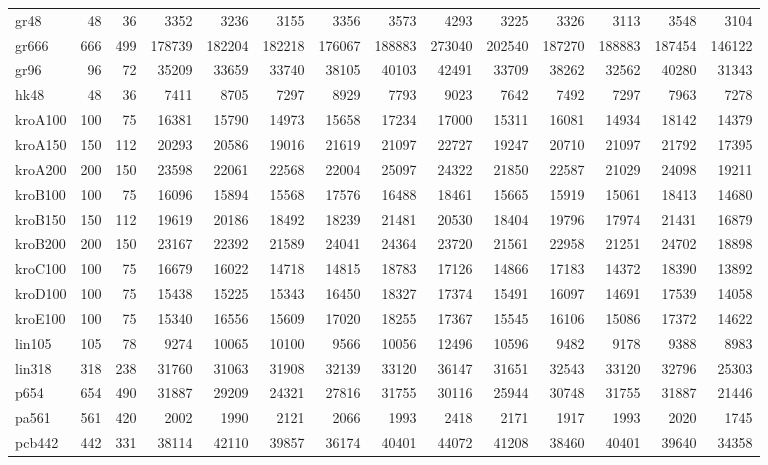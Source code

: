 {\begin{longtable}{l r r r r r r r r r r r r r}
gr48 & 48 & 36 & 3352 & 3236 & 3155 & 3356 & 3573 & 4293 & 3225 & 3326 & 3113 & 3548 & 3104 \\
gr666 & 666 & 499 & 178739 & 182204 & 182218 & 176067 & 188883 & 273040 & 202540 & 187270 & 188883 & 187454 & 146122 \\
gr96 & 96 & 72 & 35209 & 33659 & 33740 & 38105 & 40103 & 42491 & 33709 & 38262 & 32562 & 40280 & 31343 \\
hk48 & 48 & 36 & 7411 & 8705 & 7297 & 8929 & 7793 & 9023 & 7642 & 7492 & 7297 & 7963 & 7278 \\
kroA100 & 100 & 75 & 16381 & 15790 & 14973 & 15658 & 17234 & 17000 & 15311 & 16081 & 14934 & 18142 & 14379 \\
kroA150 & 150 & 112 & 20293 & 20586 & 19016 & 21619 & 21097 & 22727 & 19247 & 20710 & 21097 & 21792 & 17395 \\
kroA200 & 200 & 150 & 23598 & 22061 & 22568 & 22004 & 25097 & 24322 & 21850 & 22587 & 21029 & 24098 & 19211 \\
kroB100 & 100 & 75 & 16096 & 15894 & 15568 & 17576 & 16488 & 18461 & 15665 & 15919 & 15061 & 18413 & 14680 \\
kroB150 & 150 & 112 & 19619 & 20186 & 18492 & 18239 & 21481 & 20530 & 18404 & 19796 & 17974 & 21431 & 16879 \\
kroB200 & 200 & 150 & 23167 & 22392 & 21589 & 24041 & 24364 & 23720 & 21561 & 22958 & 21251 & 24702 & 18898 \\
kroC100 & 100 & 75 & 16679 & 16022 & 14718 & 14815 & 18783 & 17126 & 14866 & 17183 & 14372 & 18390 & 13892 \\
kroD100 & 100 & 75 & 15438 & 15225 & 15343 & 16450 & 18327 & 17374 & 15491 & 16097 & 14691 & 17539 & 14058 \\
kroE100 & 100 & 75 & 15340 & 16556 & 15609 & 17020 & 18255 & 17367 & 15545 & 16106 & 15086 & 17372 & 14622 \\
lin105 & 105 & 78 & 9274 & 10065 & 10100 & 9566 & 10056 & 12496 & 10596 & 9482 & 9178 & 9388 & 8983 \\
lin318 & 318 & 238 & 31760 & 31063 & 31908 & 32139 & 33120 & 36147 & 31651 & 32543 & 33120 & 32796 & 25303 \\
p654 & 654 & 490 & 31887 & 29209 & 24321 & 27816 & 31755 & 30116 & 25944 & 30748 & 31755 & 31887 & 21446 \\
pa561 & 561 & 420 & 2002 & 1990 & 2121 & 2066 & 1993 & 2418 & 2171 & 1917 & 1993 & 2020 & 1745 \\
pcb442 & 442 & 331 & 38114 & 42110 & 39857 & 36174 & 40401 & 44072 & 41208 & 38460 & 40401 & 39640 & 34358 \\

\end{longtable}}
